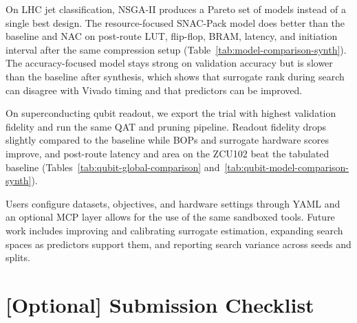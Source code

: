 \documentclass[11pt]{article}
\begin{document}
On LHC jet classification, NSGA-II produces a Pareto set of models instead of a single best design. The resource-focused SNAC-Pack model does better than the baseline and NAC on post-route LUT, flip-flop, BRAM, latency, and initiation interval after the same compression setup (Table~\ref{tab:model-comparison-synth}). The accuracy-focused model stays strong on validation accuracy but is slower than the baseline after synthesis, which shows that surrogate rank during search can disagree with Vivado timing and that predictors can be improved.

On superconducting qubit readout, we export the trial with highest validation fidelity and run the same QAT and pruning pipeline. Readout fidelity drops slightly compared to the baseline while BOPs and surrogate hardware scores improve, and post-route latency and area on the ZCU102 beat the tabulated baseline (Tables~\ref{tab:qubit-global-comparison} and~\ref{tab:qubit-model-comparison-synth}).

Users configure datasets, objectives, and hardware settings through YAML and an optional MCP layer allows for the use of the same sandboxed tools.
Future work includes improving and calibrating surrogate estimation, expanding search spaces as predictors support them, and reporting search variance across seeds and splits.

\clearpage
\newpage


\newpage
\section{[Optional] Submission Checklist}
\end{document}

